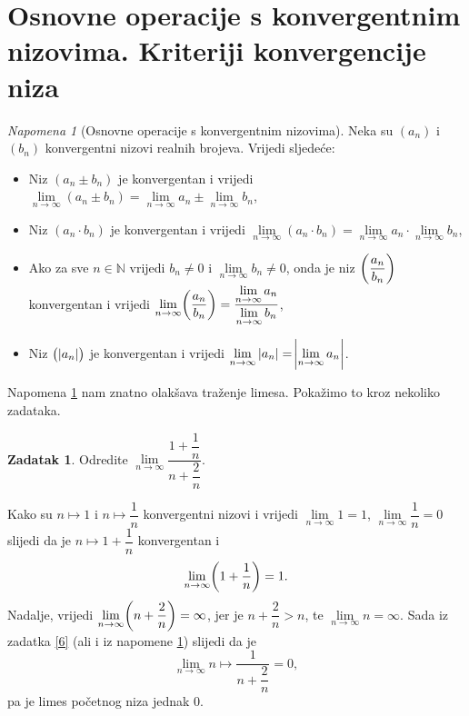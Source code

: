 \documentclass{book}
\let\originalleft\left
\let\originalright\right
\renewcommand{\left}{\mathopen{}\mathclose\bgroup\originalleft}
\renewcommand{\right}{\aftergroup\egroup\originalright}
\renewenvironment{proof}{%
    \vspace{-\parskip}\begin{oldproof}%
    }{%
    \end{oldproof}%
}
\theoremstyle{definition}
\theoremstyle{definition}
\newtheorem{exercise}{Zadatak}
\theoremstyle{remark}
\newtheorem{remark}{Napomena}
\begin{document}
\section{Osnovne operacije s konvergentnim nizovima. Kriteriji konvergencije niza}
\begin{remark}[Osnovne operacije s konvergentnim nizovima]
\label{fundamentalop}
Neka su $(a_n)$ i $(b_n)$ konvergentni nizovi realnih brojeva. Vrijedi sljedeće:
\begin{itemize}
\item Niz $(a_n\pm b_n)$ je konvergentan i vrijedi $\lim\limits_{n\to \infty}(a_n\pm b_n)=\lim\limits_{n\to \infty}{a_n}\pm \lim\limits_{n\to \infty}{b_n}$,

\item Niz $(a_n\cdot b_n)$ je konvergentan i vrijedi $\lim\limits_{n\to \infty}(a_n\cdot b_n)=\lim\limits_{n\to \infty}{a_n}\cdot \lim\limits_{n\to \infty}{b_n}$,

\item Ako za sve $n\in \mathbb{N}$ vrijedi $b_n\neq 0$ i $\lim\limits_{n\to \infty}{b_n}\neq 0$, onda je niz $\left(\dfrac{a_n}{b_n}\right)$ konvergentan i vrijedi $\lim\limits_{n\to \infty}\left(\dfrac{a_n}{b_n}\right)=\dfrac{\lim\limits_{n\to \infty}{a_n}}{\lim\limits_{n\to \infty}{b_n}}$,

\item Niz $\left(|a_n|\right)$ je konvergentan i vrijedi $\lim\limits_{n\to \infty}{|a_n|}=\abs{\lim\limits_{n\to \infty}{a_n}}$.
\end{itemize}
\end{remark}
Napomena \ref{fundamentalop} nam znatno olakšava traženje limesa. Pokažimo to kroz nekoliko zadataka.
\begin{exercise}
Odredite $\lim\limits_{n\to \infty}{\dfrac{1+\dfrac{1}{n}}{n+\dfrac{2}{n}}}$.
\end{exercise}
\begin{proof}[Rješenje]
Kako su $n\mapsto 1$ i $n\mapsto \dfrac{1}{n}$ konvergentni nizovi i vrijedi $\lim\limits_{n\to \infty}{1}=1$, $\lim\limits_{n\to \infty}{\dfrac{1}{n}}=0$ slijedi da je $n\mapsto 1+\dfrac{1}{n}$ konvergentan i $$\lim\limits_{n\to \infty}\left(1+\dfrac{1}{n}\right)=1.$$ Nadalje, vrijedi $\lim\limits_{n\to \infty}\left(n+\dfrac{2}{n}\right)=\infty$, jer je $n+\dfrac{2}{n}>n$, te $\lim\limits_{n\to \infty}{n}=\infty$. Sada iz zadatka \ref{6} (ali i iz napomene \ref{fundamentalop}) slijedi da je $$\lim\limits_{n\to \infty}{n\mapsto \dfrac{1}{n+\dfrac{2}{n}}}=0,$$ pa je limes početnog niza jednak $0$.
\end{proof}
\end{document}
